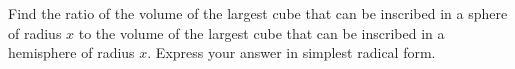 Find the ratio of the volume of the largest cube that can be inscribed in a sphere of radius $x$ to the volume of the largest cube that can be inscribed in a hemisphere of radius $x$. Express your answer in simplest radical form.
